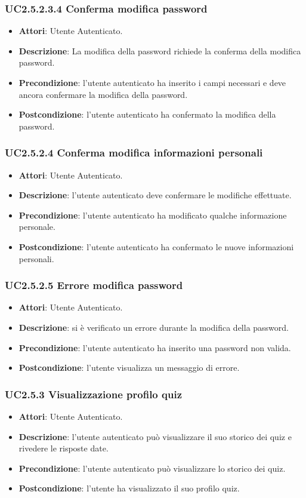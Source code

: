 \subsubsection{UC2.5.2.3.4 Conferma modifica password}
\begin{itemize}
\item \textbf{Attori}: Utente Autenticato.
\item \textbf{Descrizione}: La modifica della password richiede la conferma della modifica password.
\item \textbf{Precondizione}: l'utente autenticato ha inserito i campi necessari e deve ancora confermare la modifica della password.
\item \textbf{Postcondizione}: l'utente autenticato ha confermato la modifica della password.
\end{itemize}
\subsubsection{UC2.5.2.4 Conferma modifica informazioni personali}
\begin{itemize}
\item \textbf{Attori}: Utente Autenticato.
\item \textbf{Descrizione}: l'utente autenticato deve confermare le modifiche effettuate.
\item \textbf{Precondizione}: l'utente autenticato ha modificato qualche informazione personale.
\item \textbf{Postcondizione}: l'utente autenticato ha confermato  le nuove informazioni personali.
\end{itemize}
\subsubsection{UC2.5.2.5 Errore modifica password}
\begin{itemize}
\item \textbf{Attori}: Utente Autenticato.
\item \textbf{Descrizione}: si è verificato un errore durante la modifica della password.
\item \textbf{Precondizione}: l'utente autenticato ha inserito una password non valida.
\item \textbf{Postcondizione}: l'utente visualizza un messaggio di errore.
\end{itemize}
\subsubsection{UC2.5.3 Visualizzazione profilo quiz}
\begin{itemize}
\item \textbf{Attori}: Utente Autenticato.
\item \textbf{Descrizione}: l'utente autenticato può visualizzare il suo storico dei quiz e rivedere le risposte date.
\item \textbf{Precondizione}: l'utente autenticato può visualizzare lo storico dei quiz.
\item \textbf{Postcondizione}: l'utente ha visualizzato il suo profilo quiz.
\end{itemize}
